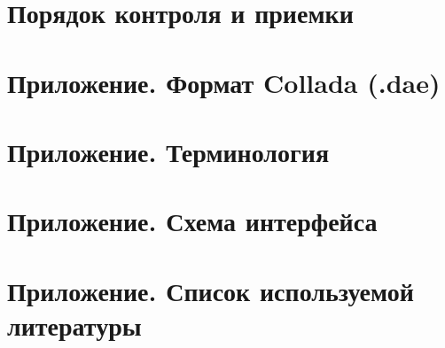 \documentclass[
encoding=utf8
]{../twoeskd}
\begin{document}
\newpage
\section{Порядок контроля и приемки}



\newpage
\section{Приложение. Формат Collada (.dae)}


\newpage
\section{Приложение. Терминология}


\newpage
\section{Приложение. Схема интерфейса}


\newpage
\section{Приложение. Список используемой литературы}



\newpage
\eskdListOfChanges

\end{document}
